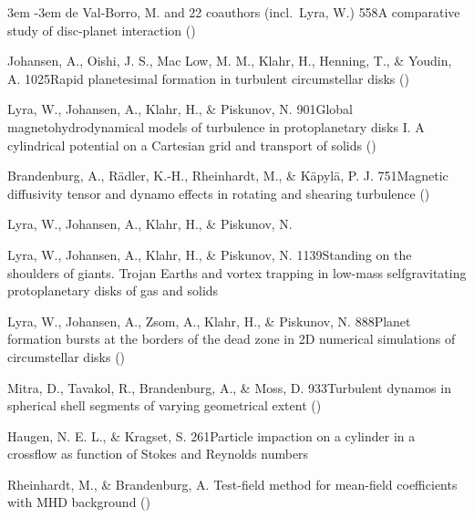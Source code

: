 \documentclass[\mydriver,12pt,twoside,notitlepage,a4paper]{article}
\begin{document}
\begin{list}{}{\leftmargin 3em \itemindent -3em\listparindent \itemindent
\itemsep 0pt \parsep 1pt}
de Val-Borro, M. and 22 coauthors (incl.\ Lyra, W.)
{558}{A comparative study of disc-planet interaction}
()

Johansen, A., Oishi, J. S., Mac Low, M. M., Klahr, H., Henning, T.,
\& Youdin, A.
{1025}{Rapid planetesimal formation in turbulent circumstellar disks}
()

Lyra, W., Johansen, A., Klahr, H., \& Piskunov, N.
{901}{Global magnetohydrodynamical models of turbulence in protoplanetary disks I. A cylindrical potential on a Cartesian grid and transport of solids}
()

Brandenburg, A., R\"adler, K.-H., Rheinhardt, M., \& K\"apyl\"a, P. J.
{751}{Magnetic diffusivity tensor and dynamo effects in rotating
and shearing turbulence}
()

Lyra, W., Johansen, A., Klahr, H., \& Piskunov, N.

Lyra, W., Johansen, A., Klahr, H., \& Piskunov, N.
{1139}{Standing on the shoulders of giants. Trojan Earths and vortex trapping in low-mass selfgravitating protoplanetary disks of gas and solids}

Lyra, W., Johansen, A., Zsom, A., Klahr, H., \& Piskunov, N.
{888}{Planet formation bursts at the borders of the dead zone in 2D numerical simulations of circumstellar disks}
()

Mitra, D., Tavakol, R., Brandenburg, A., \& Moss, D.
{933}{Turbulent dynamos in spherical shell segments of varying geometrical extent} ()

Haugen, N. E. L., \& Kragset, S.
{261}{Particle impaction on a cylinder in a crossflow as function of Stokes and Reynolds numbers}

Rheinhardt, M., \& Brandenburg, A.
{Test-field method for mean-field coefficients with MHD background}
()


\end{list}
\end{document}
